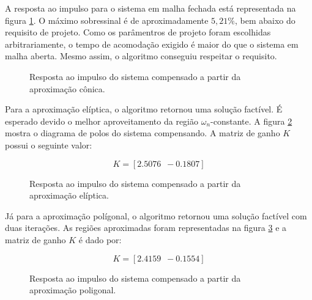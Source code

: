 A resposta ao impulso para o sistema em malha fechada está representada na figura \ref{fig:ImpulseC}. O máximo sobressinal é de aproximadamente $5,21\%$, bem abaixo do requisito de projeto.  Como os parâmentros de projeto foram escolhidas arbitrariamente, o tempo de acomodação exigido é maior do que o sistema em malha aberta. Mesmo assim, o algoritmo conseguiu respeitar o requisito.

\begin{figure}[!ht]
  \centering
  
  \caption{Resposta ao impulso do sistema compensado a partir da aproximação cônica.}
  \label{fig:ImpulseC}
\end{figure}

Para a aproximação elíptica, o algoritmo retornou uma solução factível. É esperado devido o melhor aproveitamento da região $\omega_n$-constante. A figura \ref{fig:ImpulseE} mostra o diagrama de polos do sistema compensando. A matriz de ganho $K$ possui o seguinte valor:

\begin{equation}
  K = \left[2.5076 \enspace -0.1807\right]\label{res:GanhoE}
\end{equation}

\begin{figure}[!ht]
  \centering
  
  \caption{Resposta ao impulso do sistema compensado a partir da aproximação elíptica.}
  \label{fig:ImpulseE}
\end{figure}

Já para a aproximação polígonal, o algoritmo retornou uma solução factível com duas iterações. As regiões aproximadas foram representadas na figura \ref{fig:ImpulseP} e a matriz de ganho $K$ é dado por:

\begin{equation}
  K = \left[2.4159 \enspace -0.1554\right]\label{res:GanhoP}
\end{equation}

\begin{figure}[!ht]
  \centering
  
  \caption{Resposta ao impulso do sistema compensado a partir da aproximação poligonal.}
  \label{fig:ImpulseP}
\end{figure}